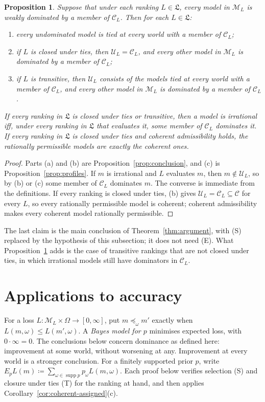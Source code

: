 \documentclass[11pt]{article}
\newtheorem{proposition}[theorem]{Proposition}
\theoremstyle{definition}
\newcommand{\M}{\mathcal M}
\newcommand{\C}{\mathcal C}
\newcommand{\U}{\mathcal U}
\newcommand{\Lf}{\mathfrak L}
\newcommand{\supp}{\operatorname{supp}}
\begin{document}
\begin{proposition}\label{prop:permissible}
Suppose that under each ranking $L\in\Lf$, every model in $\M_L$ is weakly dominated by a member of $\C_L$. Then for each $L\in\Lf$:
\begin{enumerate}[label=(\alph*)]
\item every undominated model is tied at every world with a member of $\C_L$;
\item if $L$ is closed under ties, then $\U_L=\C_L$, and every other model in $\M_L$ is dominated by a member of $\C_L$;
\item if $L$ is transitive, then $\U_L$ consists of the models tied at every world with a member of $\C_L$, and every other model in $\M_L$ is dominated by a member of $\C_L$.
\end{enumerate}
If every ranking in $\Lf$ is closed under ties or transitive, then a model is irrational iff, under every ranking in $\Lf$ that evaluates it, some member of $\C_L$ dominates it. If every ranking in $\Lf$ is closed under ties and coherent admissibility holds, the rationally permissible models are exactly the coherent ones.
\end{proposition}
\begin{proof}
Parts (a) and (b) are Proposition~\ref{prop:conclusion}, and (c) is Proposition~\ref{prop:profiles}. If $m$ is irrational and $L$ evaluates $m$, then $m\notin\U_L$, so by (b) or (c) some member of $\C_L$ dominates $m$. The converse is immediate from the definitions. If every ranking is closed under ties, (b) gives $\U_L=\C_L\subseteq\C$ for every $L$, so every rationally permissible model is coherent; coherent admissibility makes every coherent model rationally permissible.
\end{proof}
The last claim is the main conclusion of Theorem~\ref{thm:argument}, with (S) replaced by the hypothesis of this subsection; it does not need (E). What Proposition~\ref{prop:permissible} adds is the case of transitive rankings that are not closed under ties, in which irrational models still have dominators in $\C_L$.

\section{Applications to accuracy}\label{sec:short-applications}
For a loss $L:\M_L\times\Omega\to[0,\infty]$, put $m\preceq_\omega m'$ exactly when $L(m,\omega)\le L(m',\omega)$. A \emph{Bayes model for $p$} minimises expected loss, with $0\cdot\infty=0$. The conclusions below concern dominance as defined here: improvement at some world, without worsening at any. Improvement at every world is a stronger conclusion. {\color{red} For a finitely supported prior $p$, write $E_pL(m)\coloneqq\sum_{\omega\in\supp p}p_\omega L(m,\omega)$. Each proof below verifies selection (S) and closure under ties (T) for the ranking at hand, and then applies Corollary~\ref{cor:coherent-assigned}(c).}
\end{document}
